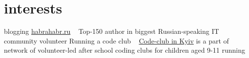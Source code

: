 \documentclass[hidelinks,a4paper]{cv}
\begin{document}
\section{interests}
\begin{entrylist}
   \entry
    {blogging}
    {\href{http://habrahabr.ru/users/patapsmile/}{habrahabr.ru}}
    {~}
    {Top-150 author in biggest Russian-speaking IT community}
   \entry
    {volunteer}
    {Running a code club}
    {~}
    {\href{https://www.codeclub.org.uk/}{Code-club in Kyiv} is a part of network of volunteer-led after school coding clubs for children aged 9-11}
   \entry
    {running}
    {~}
    {~}
    {~}
\end{entrylist}
\end{document}
